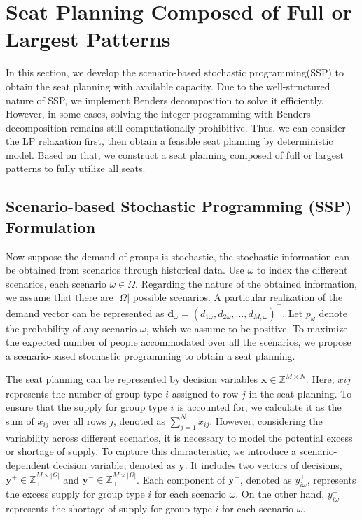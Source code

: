 
\section{Seat Planning Composed of Full or Largest Patterns}
In this section, we develop the scenario-based stochastic programming(SSP) to obtain the seat planning with available capacity. Due to the well-structured nature of SSP, we implement Benders decomposition to solve it efficiently. However, in some cases, solving the integer programming with Benders decomposition remains still computationally prohibitive. Thus, we can consider the LP relaxation first, then obtain a feasible seat planning by deterministic model. Based on that, we construct a seat planning composed of full or largest patterns to fully utilize all seats.


\subsection{Scenario-based Stochastic Programming (SSP) Formulation}
Now suppose the demand of groups is stochastic, the stochastic information can be obtained from scenarios through historical data. Use $\omega$ to index the different scenarios, each scenario $\omega \in \Omega$. Regarding the nature of the obtained information, we assume that there are $|\Omega|$ possible scenarios. A particular realization of the demand vector can be represented as $\mathbf{d}_\omega = (d_{1\omega},d_{2\omega},\ldots,d_{M,\omega})^{\intercal}$. Let $p_{\omega}$ denote the probability of any scenario $\omega$, which we assume to be positive. To maximize the expected number of people accommodated over all the scenarios, we propose a scenario-based stochastic programming to obtain a seat planning.

The seat planning can be represented by decision variables $\mathbf{x} \in \mathbb{Z}_{+}^{M \times N}$. Here, $x{ij}$ represents the number of group type $i$ assigned to row $j$ in the seat planning. To ensure that the supply for group type $i$ is accounted for, we calculate it as the sum of $x_{ij}$ over all rows $j$, denoted as $\sum_{j=1}^N x_{ij}$. However, considering the variability across different scenarios, it is necessary to model the potential excess or shortage of supply. To capture this characteristic, we introduce a scenario-dependent decision variable, denoted as $\mathbf{y}$. 
It includes two vectors of decisions, $\mathbf{y}^{+} \in \mathbb{Z}_{+}^{M \times |\Omega|}$ and $\mathbf{y}^{-} \in \mathbb{Z}_{+}^{M \times |\Omega|}$. Each component of $\mathbf{y}^{+}$, denoted as $y_{i\omega}^{+}$, represents the excess supply for group type $i$ for each scenario $\omega$. On the other hand, $y_{i\omega}^{-}$ represents the shortage of supply for group type $i$ for each scenario $\omega$.

